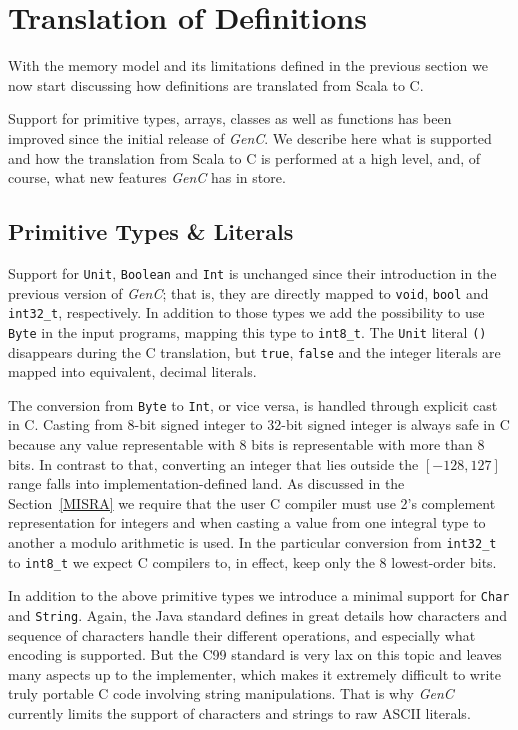 \documentclass[a4paper,twoside]{article}
\newcommand{\InlineC}[1]{\lstinline[language=C99]|#1|}
\newcommand{\InlineS}[1]{\lstinline[language=Leon]|#1|}
\let\oldsection\section
\renewcommand\section{\cleardoublepage\oldsection}
\newcommand{\GenC}{\emph{GenC}\xspace}
\newcommand{\RefSec}[1]{Section~\ref{#1}}
\begin{document}
\section{Translation of Definitions}
\label{translation_defs}

With the memory model and its limitations defined in the previous section we now
start discussing how definitions are translated from Scala to C.

Support for primitive types, arrays, classes as well as functions has been
improved since the initial release of \GenC. We describe here what is supported
and how the translation from Scala to C is performed at a high level, and, of
course, what new features \GenC has in store.

\subsection{Primitive Types \& Literals}
\label{primitive_type}


Support for \InlineS{Unit}, \InlineS{Boolean} and \InlineS{Int} is unchanged
since their introduction in the previous version of \GenC; that is, they are
directly mapped to \InlineC{void}, \InlineC{bool} and \InlineC{int32_t},
respectively. In addition to those types we add the possibility to use
\InlineS{Byte} in the input programs, mapping this type to \InlineC{int8_t}.
The \InlineS{Unit} literal \InlineS{()} disappears during the C translation, but
\InlineS{true}, \InlineS{false} and the integer literals are mapped into
equivalent, decimal literals.

The conversion from \InlineS{Byte} to \InlineS{Int}, or vice versa, is handled
through explicit cast in C. Casting from 8-bit signed integer to 32-bit signed
integer is always safe in C because any value representable with 8 bits is
representable with more than 8 bits. In contrast to that, converting an integer
that lies outside the $[-128, 127]$ range falls into implementation-defined
land. As discussed in the \RefSec{MISRA} we require that the user C compiler
must use 2's complement representation for integers and when casting a value
from one integral type to another a modulo arithmetic is used. In the particular
conversion from \InlineC{int32_t} to \InlineC{int8_t} we expect C compilers to,
in effect, keep only the 8 lowest-order bits.

In addition to the above primitive types we introduce a minimal support for
\InlineS{Char} and \InlineS{String}. Again, the Java standard defines in great
details how characters and sequence of characters handle their different
operations, and especially what encoding is supported. But the C99 standard is
very lax on this topic and leaves many aspects up to the implementer, which
makes it extremely difficult to write truly portable C code involving string
manipulations. That is why \GenC currently limits the support of characters and
strings to raw ASCII literals.
\end{document}
